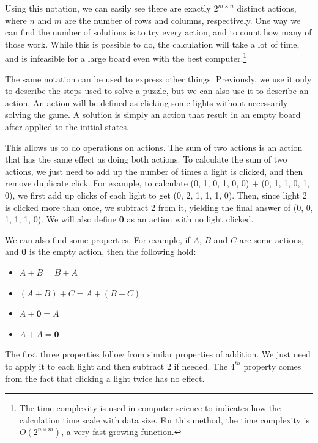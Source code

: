 \documentclass[a4paper, 12pt]{article}
\begin{document}
Using this notation, we can easily see there are exactly \(2^{m\times n}\) distinct actions, where $n$ and $m$ are the number of rows and columns, respectively. One way we can find the number of solutions is to try every action, and to count how many of those work. While this is possible to do, the calculation will take a lot of time,  and is infeasible for a large board even with the best computer.\footnote{The time complexity is used in computer science to indicates how the calculation time scale with data size. For this method, the time complexity is \(O(2^{n\times m})\), a very fast growing function.}

The same notation can be used to express other things. Previously, we use it only to describe the steps used to solve a puzzle, but we can also use it to describe an action. An action will be defined as clicking some lights without necessarily solving the game. A solution is simply an action that result in an empty board after applied to the initial states.

This allows us to do operations on actions. The sum of two actions is an action that has the same effect as doing both actions. To calculate the sum of two actions, we just need to add up the number of times a light is clicked, and then remove duplicate click. For example, to calculate (0, 1, 0, 1, 0, 0) + (0, 1, 1, 0, 1, 0), we first add up clicks of each light to get (0, 2, 1, 1, 1, 0). Then, since light 2 is clicked more than once, we subtract 2 from it, yielding the final answer of (0, 0, 1, 1, 1, 0). We will also define \textbf{0} as an action with no light clicked. 

We can also find some properties. For example, if $A$, $B$ and $C$ are some actions, and \textbf{0} is the empty action, then the following hold:
\vspace{-1.5cm}
\begin{singlespace}
\begin{itemize}
  \item \(A+B=B+A\)
  \item \((A+B)+C = A+(B+C)\)
  \item \(A+\textbf{0} = A\)
  \item \(A+A = \textbf{0}\)
\end{itemize}
\end{singlespace}

The first three properties follow from similar properties of addition. We just need to apply it to each light and then subtract 2 if needed. The \(4^{th}\) property comes from the fact that clicking a light twice has no effect. 
\end{document}
